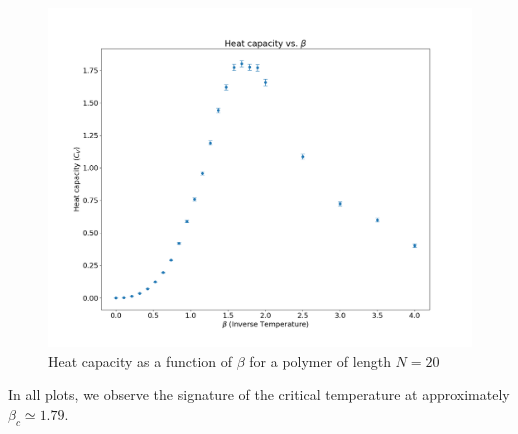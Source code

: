 \begin{figure}[h!]
    \vspace{0.5cm} %
    
    \begin{minipage}[b]{0.45\textwidth}
        \centering
        \includegraphics[width=\textwidth]{FIG/exercise_6_images/heat_capacity_mmc.png}
        \caption{Heat capacity as a function of $\beta$ for a polymer of length $N = 20$}
        \label{heat_capacity_mmc}
    \end{minipage}
\end{figure}

In all plots, we observe the signature of the critical temperature at approximately $\beta_c \simeq 1.79$.

